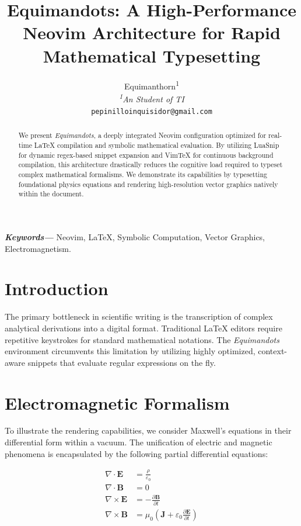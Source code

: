 \documentclass[twocolumn, 10pt]{article}
\title{\vspace{-1.5cm}\LARGE\bfseries Equimandots: A High-Performance Neovim Architecture for Rapid Mathematical Typesetting}
\author{
    \normalsize Equimanthorn\textsuperscript{1} \\
    \small \textit{\textsuperscript{1}An Student of TI} \\
    \small \texttt{pepinilloinquisidor@gmail.com}
}
\date{\vspace{-0.5cm}}
\begin{document}
\maketitle

\begin{abstract}
\noindent We present \textit{Equimandots}, a deeply integrated Neovim configuration optimized for real-time \LaTeX{} compilation and symbolic mathematical evaluation. By utilizing LuaSnip for dynamic regex-based snippet expansion and VimTeX for continuous background compilation, this architecture drastically reduces the cognitive load required to typeset complex mathematical formalisms. We demonstrate its capabilities by typesetting foundational physics equations and rendering high-resolution vector graphics natively within the document.
\end{abstract}

\vspace{0.2cm}
\noindent \textbf{\textit{Keywords---}} Neovim, \LaTeX{}, Symbolic Computation, Vector Graphics, Electromagnetism.

\section{Introduction}

The primary bottleneck in scientific writing is the transcription of complex analytical derivations into a digital format. Traditional \LaTeX{} editors require repetitive keystrokes for standard mathematical notations. The \textit{Equimandots} environment circumvents this limitation by utilizing highly optimized, context-aware snippets that evaluate regular expressions on the fly.

\section{Electromagnetic Formalism}

To illustrate the rendering capabilities, we consider Maxwell's equations in their differential form within a vacuum. The unification of electric and magnetic phenomena is encapsulated by the following partial differential equations:

\begin{align}
    \nabla \cdot \mathbf{E} &= \frac{\rho}{\varepsilon_0} \label{eq:gauss} \\
    \nabla \cdot \mathbf{B} &= 0 \label{eq:gauss_mag} \\
    \nabla \times \mathbf{E} &= -\frac{\partial \mathbf{B}}{\partial t} \label{eq:faraday} \\
    \nabla \times \mathbf{B} &= \mu_0 \left( \mathbf{J} + \varepsilon_0 \frac{\partial \mathbf{E}}{\partial t} \right) \label{eq:ampere}
\end{align}
\end{document}
